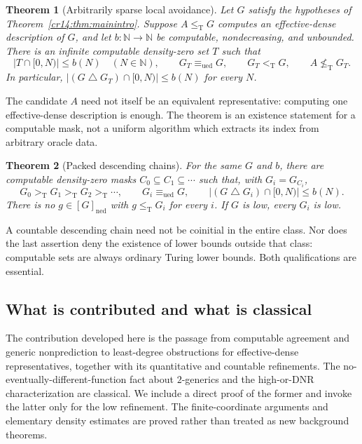 \documentclass[11pt,a4paper]{article}
\newcommand{\N}{\mathbb N}
\newcommand{\leT}{\leq_{\mathrm T}}
\newcommand{\nleT}{\nleq_{\mathrm T}}
\newcommand{\ltT}{<_{\mathrm T}}
\newcommand{\ned}{\mathrm{ned}}
\newcommand{\ued}{\mathrm{ued}}
\newcommand{\eqU}{\equiv_{\ued}}
\newcommand{\symdiff}{\mathbin{\triangle}}
\newtheorem{theorem}{Theorem}[section]
\theoremstyle{definition}
\theoremstyle{remark}
\begin{document}
\begin{theorem}[Arbitrarily sparse local avoidance]\label{cr14:thm:localintro}
Let $G$ satisfy the hypotheses of Theorem~\ref{cr14:thm:mainintro}.
Suppose $A\leT G$ computes an effective-dense description of $G$, and let
$b:\N\to\N$ be computable, nondecreasing, and unbounded. There is an
infinite computable density-zero set $T$ such that
\[
 |T\cap[0,N)|\leq b(N)\quad(N\in\N),\qquad
 G_T\eqU G,\qquad G_T\ltT G,\qquad A\nleT G_T.
\]
In particular, $|(G\symdiff G_T)\cap[0,N)|\leq b(N)$ for every $N$.
\end{theorem}

The candidate $A$ need not itself be an equivalent representative: computing
one effective-dense description is enough. The theorem is an existence
statement for a computable mask, not a uniform algorithm which extracts its
index from arbitrary oracle data.

\begin{theorem}[Packed descending chains]\label{cr14:thm:chainintro}
For the same $G$ and $b$, there are computable density-zero masks
$C_0\subseteq C_1\subseteq\cdots$ such that, with $G_i=G_{C_i}$,
\[
 G_0>_{\mathrm T}G_1>_{\mathrm T}G_2>_{\mathrm T}\cdots,
 \qquad G_i\eqU G,
 \qquad |(G\symdiff G_i)\cap[0,N)|\leq b(N).
\]
There is no $g\in[G]_{\ned}$ with $g\leT G_i$ for every $i$.
If $G$ is low, every $G_i$ is low.
\end{theorem}

A countable descending chain need not be coinitial in the entire class.
Nor does the last assertion deny the existence of lower bounds outside that
class: computable sets are always ordinary Turing lower bounds. Both
qualifications are essential.

\subsection{What is contributed and what is classical}
The contribution developed here is the passage from computable agreement
and generic nonprediction to least-degree obstructions for effective-dense
representatives, together with its quantitative and countable refinements.
The no-eventually-different-function fact about $2$-generics and the
high-or-DNR characterization are classical.\cite{BBNN,KMS}
We include a direct proof of the former and invoke the latter only for the
low refinement. The finite-coordinate arguments and elementary density
estimates are proved rather than treated as new background theorems.
\end{document}
